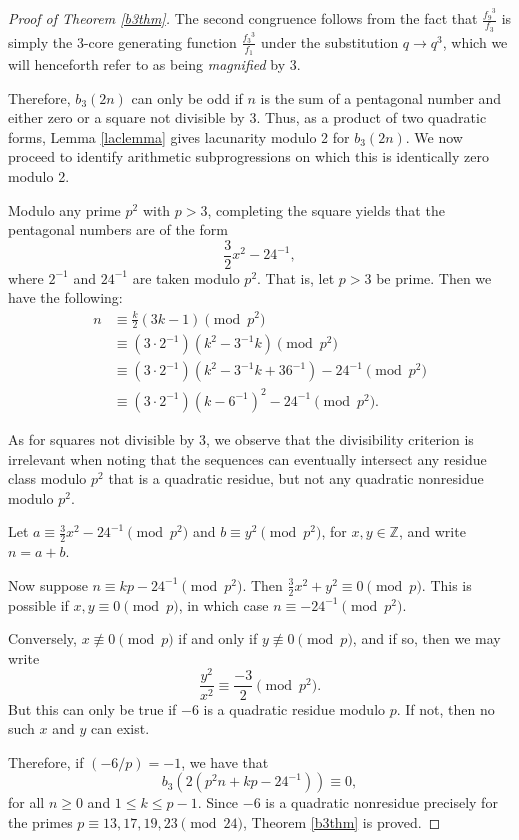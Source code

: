 \documentclass[12pt]{amsart}
\theoremstyle{definition}
\begin{document}
\begin{proof}[Proof of Theorem \ref{b3thm}]
The second congruence follows from the fact that $\frac{{f_9}^3}{f_3}$ is simply the 3-core generating function $\frac{{f_3}^3}{f_1}$ under the substitution $q \rightarrow q^3$, which we will henceforth refer to as being \emph{magnified} by 3.

Therefore, $b_3(2n)$ can only be odd if $n$ is the sum of a pentagonal number and either zero or a square not divisible by 3.  Thus, as a product of two quadratic forms, Lemma \ref{laclemma} gives lacunarity modulo 2 for $b_3(2n)$. We now proceed to identify arithmetic subprogressions on which this is identically zero modulo 2.

Modulo any prime $p^2$ with $p>3$, completing the square yields that the pentagonal numbers are of the form $$\frac{3}{2}x^2 - 24^{-1},$$ where $2^{-1}$ and $24^{-1}$ are taken modulo $p^2$.  That is, let $p > 3$ be prime.  Then we have the following:
\begin{align*} n &\equiv \frac{k}{2}(3k-1) \pmod{p^2} \\
 &\equiv (3 \cdot 2^{-1} ) (k^2 - 3^{-1} k) \pmod{p^2} \\
 &\equiv (3 \cdot 2^{-1} ) (k^2 - 3^{-1} k + 36^{-1}) - 24^{-1} \pmod{p^2} \\
 &\equiv (3 \cdot 2^{-1} ) (k - 6^{-1} )^2 - 24^{-1} \pmod{p^2}.
\end{align*}

As for squares not divisible by 3, we observe that the divisibility criterion is irrelevant when noting that  the sequences can eventually intersect any residue class modulo $p^2$ that is a quadratic residue, but not any quadratic nonresidue modulo $p^2$.

Let $a \equiv \frac{3}{2}x^2 - 24^{-1} \pmod{p^2}$ and $b \equiv y^2 \pmod{p^2}$, for $x, y \in \mathbb{Z}$, and write $n = a+b$.  

Now suppose $n \equiv kp - 24^{-1} \pmod{p^2}$.  Then $\frac{3}{2}x^2 + y^2 \equiv 0 \pmod{p}$.  This is possible if $x, y \equiv 0 \pmod{p}$, in which case $n \equiv -24^{-1} \pmod{p^2}$.  

Conversely, $x \not\equiv 0 \pmod{p}$ if and only if $y \not\equiv 0 \pmod{p}$, and if so, then we may write $$\frac{y^2}{x^2} \equiv \frac{-3}{2} \pmod{p^2}.$$
But this can only be true if $-6$ is a quadratic residue modulo $p$.  If not, then no such $x$ and $y$ can exist.

Therefore, if $(-6/p) = -1$, we have that $$b_3(2(p^2 n + kp - 24^{-1})) \equiv 0,$$ for all $n\ge 0$ and $1 \leq k \le p-1$. Since $-6$ is a quadratic nonresidue precisely for the primes $p \equiv 13, 17, 19, 23 \pmod{24}$, Theorem \ref{b3thm} is proved. \end{proof}
\end{document}
